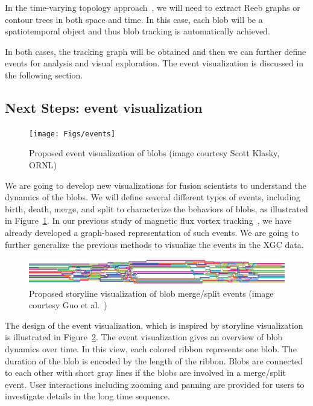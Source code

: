 In the time-varying topology approach~\cite{SohnB06}, we will need to extract Reeb graphs or contour trees in both space and time.  In this case, each blob will be a spatiotemporal object and thus blob tracking is automatically achieved.  

In both cases, the tracking graph will be obtained and then we can further define events for analysis and visual exploration.  The event visualization is discussed in the following section.  


\subsection{Next Steps: event visualization}

\begin{figure}
  \centering
  \texttt{[image: Figs/events]}
  \caption{Proposed event visualization of blobs (image courtesy Scott Klasky, ORNL)}
  \label{fig:events}
\end{figure}

We are going to develop new visualizations for fusion scientists to understand the dynamics of the blobs.  We will define several different types of events, including birth, death, merge, and split to characterize the behaviors of blobs, as illustrated in Figure~\ref{fig:events}.  In our previous study of magnetic flux vortex tracking~\cite{GuoPPKG16, GuoPG17, PhillipsGPKG16, PhillipsPKG15}, we have already developed a graph-based representation of such events.  We are going to further generalize the previous methods to visualize the events in the XGC data.  

\begin{figure}
  \centering
  \includegraphics[width=\linewidth]{Figs/storyline}
  \caption{Proposed storyline visualization of blob merge/split events (image courtesy Guo et al.~\cite{GuoPPKG16})}
  \label{fig:storyline}
\end{figure}

The design of the event visualization, which is inspired by storyline visualization~\cite{TanahashiM12} is illustrated in Figure~\ref{fig:storyline}.  The event visualization gives an overview of blob dynamics over time.  In this view, each colored ribbon represents one blob.  The duration of the blob is encoded by the length of the ribbon.  Blobs are connected to each other with short gray lines if the blobs are involved in a merge/split event.  User interactions including zooming and panning are provided for users to investigate details in the long time sequence.  

